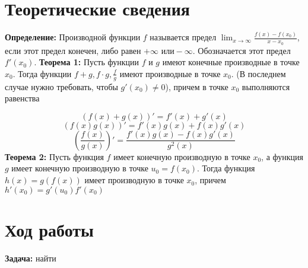 \documentclass[a4paper,12pt]{article} %
\begin{document}
\section{Теоретические сведения}
\textbf{Определение:} Производной функции $f$ называется предел $ \lim_{x\to\infty} \frac{f(x) - f(x_0)}{x - x_0}$, если этот предел конечен, либо равен $+ \infty \text{ или} - \infty$. Обозначается этот предел $f'(x_0)$.
\newline
\textbf{Теорема 1:} Пусть функции $f$ и $g$ имеют конечные производные в точке $x_0$. Тогда функции $f + g, f \cdot g, \frac{f}{g}$ имеют производные в точке $x_0.$ (В последнем случае нужно требовать, чтобы $g'(x_0) \neq 0 $), причем в точке $x_0$ выполняются равенства

$$    \left( f(x) + g(x) \right)' = f'(x) + g'(x) $$
$$    \left( f(x)g(x) \right)' = f'(x)g(x) + f(x)g'(x) $$
$$    \left( \frac{f(x)}{g(x)} \right)' = \frac{f'(x)g(x) - f(x)g'(x)}{g^2(x)} $$
\newline
\textbf{Теорема 2:} Пусть функция $f$ имеет конечную производную в точке $x_0$, а функция $g$ имеет конечную производную в точке $u_0 = f(x_0)$. Тогда функция $h(x) = g(f(x))$ имеет производную в точке $x_0$, причем $h'(x_0) = g'(u_0)f'(x_0)$

\section{Ход работы}

\textbf{Задача:} найти 
\end{document}
